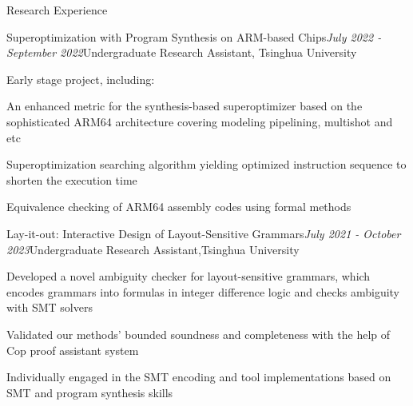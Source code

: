 \documentclass{resume} %
\newcommand{\Jul}{July }
\newcommand{\Sept}{September }
\newcommand{\Oct}{October }
\begin{document}
\begin{rSection}{Research Experience}
\begin{rSubsection}{Superoptimization with Program Synthesis on ARM-based Chips}{\em \Jul 2022 - \Sept 2022}{Undergraduate Research Assistant, \textup{Tsinghua University}}{}
    
\item Early stage project, including: 
\item An enhanced metric for the synthesis-based superoptimizer based on the sophisticated ARM64 architecture covering modeling pipelining, multishot and etc
\item Superoptimization searching algorithm yielding optimized instruction sequence to shorten the execution time
\item Equivalence checking of ARM64 assembly codes using formal methods

\end{rSubsection}



\begin{rSubsection}{Lay-it-out: Interactive Design of Layout-Sensitive Grammars}{\em \Jul 2021 - \Oct 2023}{Undergraduate Research Assistant,\textup{Tsinghua University}}{}
    
\item Developed a novel ambiguity checker for layout-sensitive grammars, which encodes grammars into formulas in integer difference logic and checks ambiguity with SMT solvers
\item Validated our methods' bounded soundness and completeness with the help of Cop proof assistant system
\item Individually engaged in the SMT encoding and tool implementations based on SMT and program synthesis skills

 \end{rSubsection}
    

\end{rSection}



    
\end{document}
